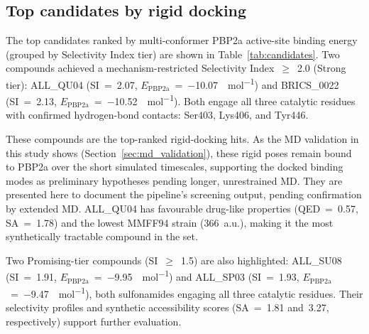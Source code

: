 \documentclass[12pt]{article}
\begin{document}
\subsection{Top candidates by rigid docking}
The top candidates ranked by multi-conformer PBP2a active-site binding energy (grouped by Selectivity Index tier) are shown in Table~\ref{tab:candidates}. Two compounds achieved a mechanism-restricted Selectivity Index~$\ge$~2.0 (Strong tier): ALL\_QU04 (SI~=~2.07, $E_{\text{PBP2a}}$~=~\SI{-10.07}{\kcal\per\mol}) and BRICS\_0022 (SI~=~2.13, $E_{\text{PBP2a}}$~=~\SI{-10.52}{\kcal\per\mol}). Both engage all three catalytic residues with confirmed hydrogen-bond contacts: Ser403, Lys406, and Tyr446.

These compounds are the top-ranked rigid-docking hits. As the MD validation in this study shows (Section~\ref{sec:md_validation}), these rigid poses remain bound to PBP2a over the short simulated timescales, supporting the docked binding modes as preliminary hypotheses pending longer, unrestrained MD. They are presented here to document the pipeline's screening output, pending confirmation by extended MD. ALL\_QU04 has favourable drug-like properties (QED~=~0.57, SA~=~1.78) and the lowest MMFF94 strain (366~a.u.), making it the most synthetically tractable compound in the set.

Two Promising-tier compounds (SI~$\ge$~1.5) are also highlighted: ALL\_SU08 (SI~=~1.91, $E_{\text{PBP2a}}$~=~\SI{-9.95}{\kcal\per\mol}) and ALL\_SP03 (SI~=~1.93, $E_{\text{PBP2a}}$~=~\SI{-9.47}{\kcal\per\mol}), both sulfonamides engaging all three catalytic residues. Their selectivity profiles and synthetic accessibility scores (SA~=~1.81 and~3.27, respectively) support further evaluation.
\end{document}
